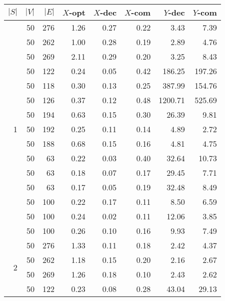 \begin{table}[]
\begin{tabular}{rrrrrrrr}
$|S|$               & $|V|$ & $|E|$ & $X$-opt & $X$-dec & $X$-com & $Y$-dec & $Y$-com \\\hline
\multirow{15}{*}{1} & 50    & 276   & 1.26    & 0.27    & 0.22    & 3.43    & 7.39    \\
                    & 50    & 262   & 1.00    & 0.28    & 0.19    & 2.89    & 4.76    \\
                    & 50    & 269   & 2.11    & 0.29    & 0.20    & 3.25    & 8.43    \\
                    & 50    & 122   & 0.24    & 0.05    & 0.42    & 186.25  & 197.26  \\
                    & 50    & 118   & 0.30    & 0.13    & 0.25    & 387.99  & 154.76  \\
                    & 50    & 126   & 0.37    & 0.12    & 0.48    & 1200.71 & 525.69  \\
                    & 50    & 194   & 0.63    & 0.15    & 0.30    & 26.39   & 9.81    \\
                    & 50    & 192   & 0.25    & 0.11    & 0.14    & 4.89    & 2.72    \\
                    & 50    & 188   & 0.68    & 0.15    & 0.16    & 4.81    & 4.75    \\
                    & 50    & 63    & 0.22    & 0.03    & 0.40    & 32.64   & 10.73   \\
                    & 50    & 63    & 0.18    & 0.07    & 0.17    & 29.45   & 7.71    \\
                    & 50    & 63    & 0.17    & 0.05    & 0.19    & 32.48   & 8.49    \\
                    & 50    & 100   & 0.22    & 0.17    & 0.11    & 8.50    & 6.59    \\
                    & 50    & 100   & 0.24    & 0.02    & 0.11    & 12.06   & 3.85    \\
                    & 50    & 100   & 0.26    & 0.10    & 0.16    & 9.93    & 7.49    \\\hline
\multirow{15}{*}{2} & 50    & 276   & 1.33    & 0.11    & 0.18    & 2.42    & 4.37    \\
                    & 50    & 262   & 1.18    & 0.15    & 0.20    & 2.16    & 2.67    \\
                    & 50    & 269   & 1.26    & 0.18    & 0.10    & 2.43    & 2.62    \\
                    & 50    & 122   & 0.23    & 0.08    & 0.28    & 43.04   & 29.13   \\

\end{tabular}
\end{table}
